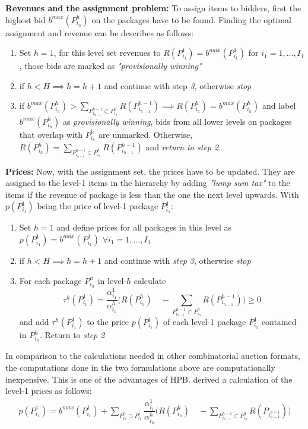 \textbf{Revenues and the assignment problem:} To assign items to bidders, first the highest bid $ b^{max}(P_{i_h}^h)$ on the packages have to be found. Finding the optimal assignment and revenue can be describes as follows:
\begin{enumerate}
	\item Set $ h = 1 $, for this level set revenues to $ R(P_{i_1}^1) = b^{max}(P_{i_1}^1)$ for $ i_1 = 1, ..., I_1 $, those bids are marked as \textit{"provisionally winning"}
	\item if $ h < H \implies h = h+1$ and continue with step \textit{3}, otherwise \textit{stop}
	\item if $ b^{max}(P_{i_h}^h) > \sum_{P_{i_{h-1}}^{h-1} \subset P_{i_h}^h} R(P_{i_{h-1}}^{h-1}) \implies R(P_{i_h}^h) = b^{max}(P_{i_h}^h)$ and label $ b^{max}(P_{i_h}^h) $ as \textit{provisionally winning}, bids from all lower levels on packages that overlap with $ P_{i_h}^h $ are unmarked. Otherwise, $ R(P_{i_h}^h) = \sum_{P_{i_{h-1}}^{h-1} \subset P_{i_h}^h}  R(P_{i_{h-1}}^{h-1})$ and \textit{return to step 2}.
\end{enumerate}

\textbf{Prices:} Now, with the assignment set, the prices have to be updated. They are assigned to the level-1 items in the hierarchy by adding \textit{"lump sum tax"} to the items if the revenue of package is less than the one the next level upwards. With $ p(P_{i_1}^1) $ being the price of level-1 package $ P_{i_1}^1 $:
\begin{enumerate}
	\item Set $ h = 1 $ and define prices for all packages in this level as $ p(P_{i_1 }^1) = b^{max}(P_{i_1}^1) $  $\forall i_1 = 1, ..., I_1 $
	\item if $ h < H  \implies h = h + 1 $ and continue with \textit{step 3}, otherwise \textit{stop}
	\item For each package $ P_{i_h}^h $ in level-$h$ calculate $$ \tau^h(P_{i_1}^1) = \dfrac{\alpha_{i_1}^1}{\alpha_{i_h}^h} \Big( R(P_{i_h}^h) \quad - \sum_{P_{i_{h-1}}^{h-1} \subset P_{i_h}^h} R(P_{i_{h-1}}^{h-1}) \Big) \geq 0 $$ and add $ \tau^h(P_{i_1}^1) $ to the price $ p(P_{i_1}^1) $ of each level-1 package $ P_{i_1}^1 $ contained in $ P_{i_h}^h $. Return to \textit{step 2}
\end{enumerate}

In comparison to the calculations needed in other combinatorial auction formats, the computations done in the two formulations above are computationally inexpensive. This is one of the advantages of HPB. \citeauthor{Goeree2010} derived a calculation of the level-1 prices as follows:
\begin{align}
	p(P_{i_1}^1) = b^{max}(P_{i_1}^1) + \sum_{P_{i_h}^h \supset P_{i_1}^1} \dfrac{\alpha_{i_1}^1}{\alpha_{i_h}^h} \Big( R(P_{i_h}^h) \quad - \sum_{P_{i_{h-1}}^{h-1} \subset P_{i_h}^h} R(P_{i_{h-1}^{h-1}}) \Big)
\end{align}

